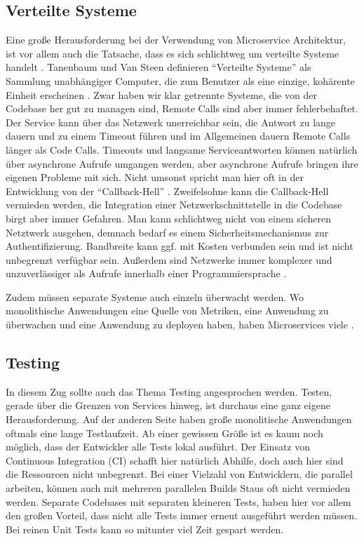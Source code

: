 \subsection{Verteilte Systeme}
Eine große Herausforderung bei der Verwendung von Microservice Architektur, ist vor allem auch die Tatsache, dass es sich schlichtweg um verteilte Systeme handelt \cite[][]{microtradeoffs}.
Tanenbaum und Van Steen definieren ``Verteilte Systeme'' als Sammlung unabhängiger Computer, die zum Benutzer als eine einzige, kohärente Einheit erscheinen \cite[][Seite 2]{tanenbaum2002distributed}.
Zwar haben wir klar getrennte Systeme, die von der Codebase her gut zu managen sind, Remote Calls sind aber immer fehlerbehaftet. Der Service kann über das Netzwerk unerreichbar sein, die Antwort zu lange dauern und zu einem Timeout führen und im Allgemeinen dauern Remote Calls länger als Code Calls. Timeouts und langsame Serviceantworten können natürlich über asynchrone Aufrufe umgangen werden, aber asynchrone Aufrufe bringen ihre eigenen Probleme mit sich. Nicht umsonst spricht man hier oft in der Entwicklung von der ``Callback-Hell'' \cite[vgl.][]{callbackhell}. Zweifelsohne kann die Callback-Hell vermieden werden, die Integration einer Netzwerkschnittstelle in die Codebase birgt aber immer Gefahren. Man kann schlichtweg nicht von einem sicheren Netztwerk ausgehen, demnach bedarf es einem Sicherheitsmechanismus zur Authentifizierung. Bandbreite kann ggf. mit Kosten verbunden sein und ist nicht unbegrenzt verfügbar sein. Außerdem sind Netzwerke immer komplexer und unzuverlässiger als Aufrufe innerhalb einer Programmiersprache \cite[vgl.][]{distributedfallacies}.

Zudem müssen separate Systeme auch einzeln überwacht werden. Wo monolithische Anwendungen eine Quelle von Metriken, eine Anwendung zu überwachen und eine Anwendung zu deployen haben, haben Microservices viele \cite[vgl.][]{Heroku:GoMicro}.

\subsection{Testing}
\label{section:testing}
In diesem Zug sollte auch das Thema Testing angesprochen werden. Testen, gerade über die Grenzen von Services hinweg, ist durchaus eine ganz eigene Herausforderung. Auf der anderen Seite haben große monolitische Anwendungen oftmals eine lange Testlaufzeit. Ab einer gewissen Größe ist es kaum noch möglich, dass der Entwickler alle Tests lokal ausführt. Der Einsatz von Continuous Integration (CI) schafft hier natürlich Abhilfe, doch auch hier sind die Ressourcen nicht unbegrenzt. Bei einer Vielzahl von Entwicklern, die parallel arbeiten, können auch mit mehreren parallelen Builds Staus oft nicht vermieden werden. Separate Codebases mit separaten kleineren Tests, haben hier vor allem den großen Vorteil, dass nicht alle Tests immer erneut ausgeführt werden müssen. Bei reinen Unit Tests kann so mitunter viel Zeit gespart werden.

